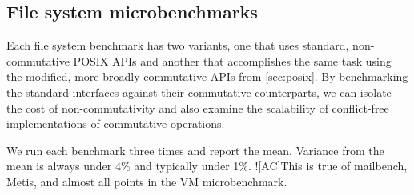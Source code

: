 \subsection{File system microbenchmarks}
\label{sec:eval:fs-microbenchmarks}




Each file system benchmark has
two variants, one that uses standard, non-commutative POSIX APIs and
another that accomplishes the same task using the modified, more broadly
commutative APIs from \cref{sec:posix}.
%
By benchmarking the standard interfaces against
their commutative counterparts, we can isolate the cost of
non-commutativity and also examine the scalability of
conflict-free implementations of commutative operations.

We run each benchmark three times and report the mean.  Variance from
the mean is always under 4\% and typically under 1\%.  
%
\XXX![AC]{This is true of mailbench, Metis, and almost all points in
  the VM microbenchmark.}

